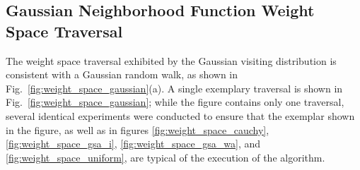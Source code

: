 \documentclass[11pt]{afthesis}
\begin{document}
	\subsection{Gaussian Neighborhood Function Weight Space Traversal} 
	
	The weight space traversal exhibited by the Gaussian visiting distribution is consistent with a Gaussian random walk, as shown in Fig.~\ref{fig:weight_space_gaussian}(a). A single exemplary traversal is shown in Fig.~\ref{fig:weight_space_gaussian}; while the figure contains only one traversal, several identical experiments were conducted to ensure that the exemplar shown in the figure, as well as in figures \ref{fig:weight_space_cauchy}, \ref{fig:weight_space_gsa_i}, \ref{fig:weight_space_gsa_wa}, and \ref{fig:weight_space_uniform}, are typical of the execution of the algorithm.
	
\end{document}
